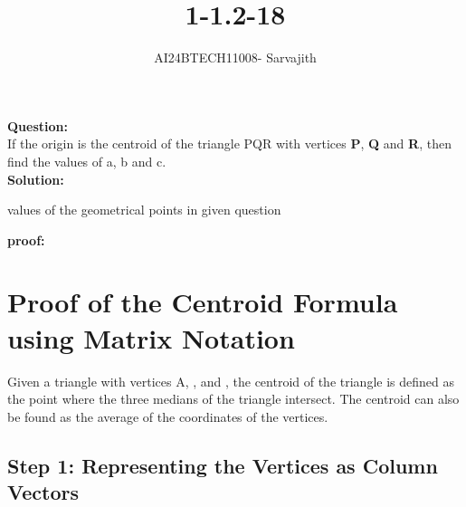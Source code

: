 \documentclass[journal]{IEEEtran}
\begin{document}

\vspace{3cm}

\title{1-1.2-18}
\author{AI24BTECH11008- Sarvajith
}
{\let\newpage\relax\maketitle}

\renewcommand{\thefigure}{\theenumi}
\renewcommand{\thetable}{\theenumi}
\setlength{\intextsep}{10pt} %
\renewcommand{\thetable}{\theenumi}
\textbf{Question: }\\
If the origin is the centroid of the triangle PQR with vertices
\textbf{P}, \textbf{Q} and \textbf{R}, then find the values of a, b and
c.\\
\textbf{Solution: }\\
\renewcommand{\tablename}{TABLE 1}
\begin{table}[h!]    
  \centering
  
  \caption{values of the geometrical points in given question}
  \label{tab1-1.2-18-1}
\end{table}
\textbf{proof: }\\


\section*{Proof of the Centroid Formula using Matrix Notation}

Given a triangle with vertices A, , and , the centroid  of the triangle is defined as the point where the three medians of the triangle intersect. The centroid can also be found as the average of the coordinates of the vertices.

\subsection*{Step 1: Representing the Vertices as Column Vectors}
\end{document}
